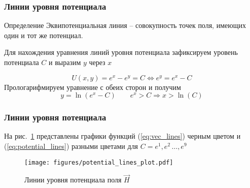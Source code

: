 \begin{frame}\frametitle{Линии уровня потенциала}
	\begin{block}{Определение}
		Эквипотенциальная линия -- совокупность точек поля, имеющих один и тот же
		потенциал.
	\end{block}

	Для нахождения уравнения линий уровня потенциала зафиксируем
	уровень потенциала \(C\) и выразим \(y\) через \(x\)

	\begin{equation*}
		U(x, y) = e^x - e^y = C \Longleftrightarrow e^y = e^x - C
	\end{equation*}
	Прологарифмируем уравнение с обеих сторон и получим
	\begin{equation}
		y = \ln(e^x - C) \qquad e^x > C \Rightarrow x > \ln(C)
		\label{eq:potential_lines}
	\end{equation}

\end{frame}

\begin{frame}\frametitle{Линии уровня потенциала}
	На рис.~\ref{fig:potential_lines} представлены графики функций
	(\ref{eq:vec_lines}) черным цветом и (\ref{eq:potential_lines})
	разными цветами для $C = e^1, e^2\, \ldots, e^9$
	\begin{figure}
		\centering
		\texttt{[image: figures/potential\_lines\_plot.pdf]}
		\caption{Линии уровня потенциала поля \(\vec H\)}\label{fig:potential_lines}
	\end{figure}

\end{frame}
